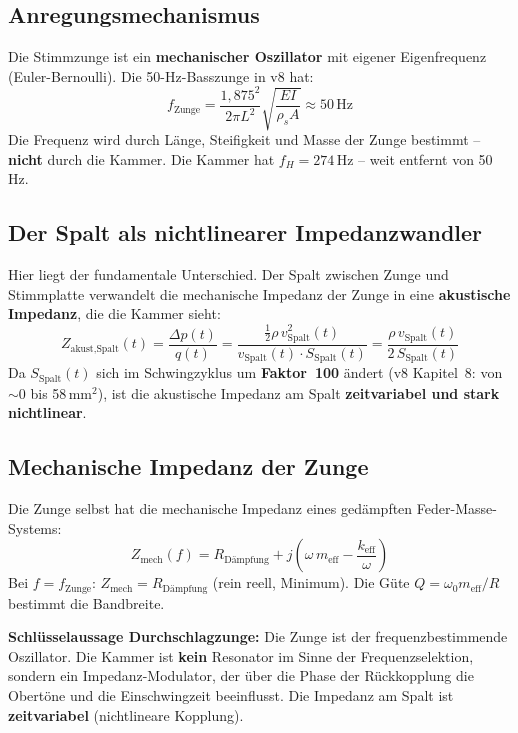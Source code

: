 \documentclass[11pt,a4paper]{article}
\begin{document}
\subsection{Anregungsmechanismus}

Die Stimmzunge ist ein \textbf{mechanischer Oszillator} mit eigener Eigenfrequenz (Euler-Bernoulli). Die 50-Hz-Basszunge in v8 hat:
\begin{equation}
f_\text{Zunge} = \frac{1{,}875^2}{2\pi L^2} \sqrt{\frac{EI}{\rho_s A}} \approx 50\,\text{Hz}
\end{equation}
Die Frequenz wird durch Länge, Steifigkeit und Masse der Zunge bestimmt -- \textbf{nicht} durch die Kammer. Die Kammer hat $f_H = 274$\,Hz -- weit entfernt von 50\,Hz.

\subsection{Der Spalt als nichtlinearer Impedanzwandler}

Hier liegt der fundamentale Unterschied. Der Spalt zwischen Zunge und Stimmplatte verwandelt die mechanische Impedanz der Zunge in eine \textbf{akustische Impedanz}, die die Kammer \glqq{}sieht\grqq{}:
\begin{equation}
Z_\text{akust,Spalt}(t) = \frac{\Delta p(t)}{q(t)} = \frac{\tfrac{1}{2}\rho\, v_\text{Spalt}^2(t)}{v_\text{Spalt}(t) \cdot S_\text{Spalt}(t)} = \frac{\rho\, v_\text{Spalt}(t)}{2\, S_\text{Spalt}(t)}
\end{equation}
Da $S_\text{Spalt}(t)$ sich im Schwingzyklus um \textbf{Faktor~100} ändert (v8 Kapitel~8: von $\sim 0$ bis 58\,mm$^2$), ist die akustische Impedanz am Spalt \textbf{zeitvariabel und stark nichtlinear}.

\subsection{Mechanische Impedanz der Zunge}

Die Zunge selbst hat die mechanische Impedanz eines gedämpften Feder-Masse-Systems:
\begin{equation}
Z_\text{mech}(f) = R_\text{Dämpfung} + j\!\left(\omega\, m_\text{eff} - \frac{k_\text{eff}}{\omega}\right)
\end{equation}
Bei $f = f_\text{Zunge}$: $Z_\text{mech} = R_\text{Dämpfung}$ (rein reell, Minimum). Die Güte $Q = \omega_0 m_\text{eff}/R$ bestimmt die Bandbreite.

\begin{keybox}
\textbf{Schlüsselaussage Durchschlagzunge:} Die Zunge ist der frequenzbestimmende Oszillator. Die Kammer ist \textbf{kein} Resonator im Sinne der Frequenzselektion, sondern ein Impedanz-Modulator, der über die Phase der Rückkopplung die Obertöne und die Einschwingzeit beeinflusst. Die Impedanz am Spalt ist \textbf{zeitvariabel} (nichtlineare Kopplung).
\end{keybox}
\end{document}
